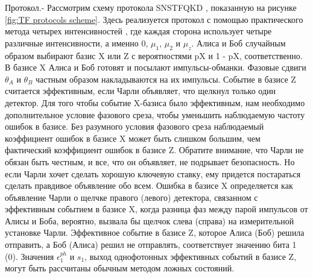 Протокол.- Рассмотрим схему протокола SNSTFQKD \cite{ma2007}, показанную на рисунке \ref{fig:TF protocols scheme}. Здесь реализуется протокол с помощью практического метода четырех интенсивностей \cite{gobby2004}, где каждая сторона использует четыре различные интенсивности, а именно 0, $\mu_1$, $\mu_2$ и $\mu_z$. Алиса и Боб случайным образом выбирают базис X или Z с вероятностями pX и 1 - pX, соответственно. В базисе X Алиса и Боб готовят и посылают импульсы-обманки. Фазовые сдвиги $\theta_A$ и $\theta_B$ частным образом накладываются на их импульсы. Событие в базисе Z считается эффективным, если Чарли объявляет, что щелкнул только один детектор. Для того чтобы событие X-базиса было эффективным, нам необходимо дополнительное условие фазового среза, чтобы уменьшить наблюдаемую частоту ошибок в базисе. Без разумного условия фазового среза наблюдаемый коэффициент ошибок в базисе X может быть слишком большим, чем фактический коэффициент ошибок в базисе Z. Обратите внимание, что Чарли не обязан быть честным, и все, что он объявляет, не подрывает безопасность. Но если Чарли хочет сделать хорошую ключевую ставку, ему придется постараться сделать правдивое объявление обо всем. Ошибка в базисе X определяется как объявление Чарли о щелчке правого (левого) детектора, связанном с эффективным событием в базисе X, когда разница фаз между парой импульсов от Алисы и Боба, вероятно, вызвала бы щелчок слева (справа) на измерительной установке Чарли. Эффективное событие в базисе Z, которое Алиса (Боб) решила отправить, а Боб (Алиса) решил не отправлять, соответствует значению бита 1 (0). Значения $\epsilon_1^{ph}$ и $s_1$, выход однофотонных эффективных событий в базисе Z, могут быть рассчитаны обычным методом ложных состояний.
